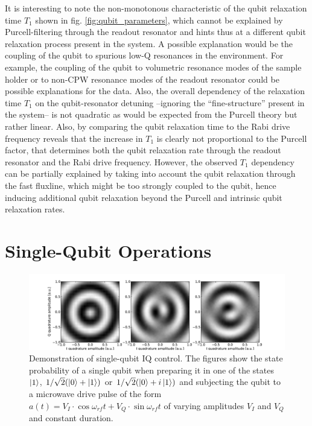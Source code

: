 \smallskip

It is interesting to note the non-monotonous characteristic of the qubit relaxation time $T_1$ shown in fig. \ref{fig:qubit_parameters}, which cannot be explained by Purcell-filtering through the readout resonator and hints thus at a different qubit relaxation process present in the system. A possible explanation would be the coupling of the qubit to spurious low-Q resonances in the environment. For example, the coupling of the qubit to volumetric resonance modes of the sample holder or to non-CPW resonance modes of the readout resonator could be possible explanations for the data. Also, the overall dependency of the relaxation time $T_1$ on the qubit-resonator detuning --ignoring the ``fine-structure'' present in the system-- is not quadratic as would be expected from the Purcell theory but rather linear. Also, by comparing the qubit relaxation time to the Rabi drive frequency reveals that the increase in $T_1$ is clearly not proportional to the Purcell factor, that determines both the qubit relaxation rate through the readout resonator and the Rabi drive frequency. However, the observed $T_1$ dependency can be partially explained by taking into account the qubit relaxation through the fast fluxline, which might be too strongly coupled to the qubit, hence inducing additional qubit relaxation beyond the Purcell and intrinsic qubit relaxation rates.

\section{Single-Qubit Operations}

\begin{figure}[ht!]
	\centering
		\includegraphics[width=1.\textwidth]{"./data/ct5/2010_12_01 - iq tomography/iq_tomographies"}
	\caption[Demonstration of single-qubit IQ control]{Demonstration of single-qubit IQ control. The figures show the state probability of a single qubit when preparing it in one of the states $\left| 1 \right>$, $1/\sqrt{2}(\left| 0 \right>+\left| 1 \right>)$ or $1/\sqrt{2}(\left| 0 \right>+i\left| 1 \right>)$ and subjecting the qubit to a microwave drive pulse of the form $a(t) = V_I\cdot\cos{\omega_{rf}t}+V_Q\cdot\sin{\omega_{rf}t}$ of varying amplitudes $V_I$ and $V_Q$ and constant duration.}
	\label{fig:single_qubit_iq_control}
\end{figure}

